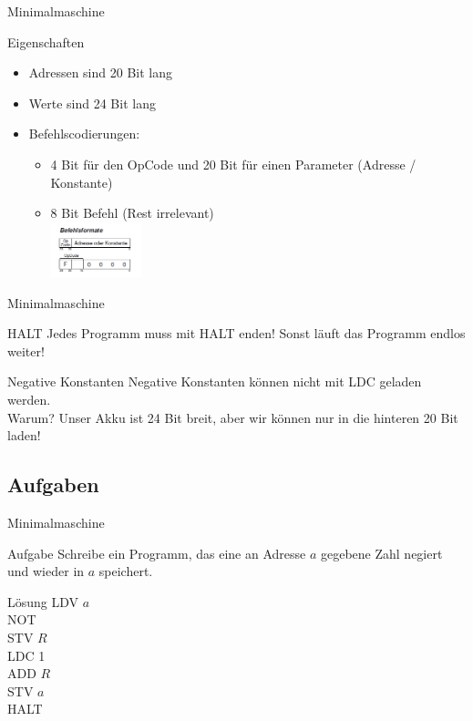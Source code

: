 \begin{frame}{Minimalmaschine}
	\begin{exampleblock}{Eigenschaften}
		\begin{itemize}
		\item Adressen sind 20 Bit lang
		\item Werte sind 24 Bit lang
		\item Befehlscodierungen:
		\begin{itemize}
			\item 4 Bit für den OpCode und 20 Bit für einen Parameter (Adresse / Konstante)
			\item 8 Bit Befehl (Rest irrelevant)\\
			\includegraphics[width=100px]{../topics/speicher-mima/MIMA_commands.png}\\
		\end{itemize} 
	\end{itemize}
	\end{exampleblock}
\end{frame}

\begin{frame}{Minimalmaschine}
	\begin{alertblock}{HALT}
		Jedes Programm muss mit HALT enden! Sonst läuft das Programm endlos weiter!
	\end{alertblock}

	\begin{alertblock}{Negative Konstanten}
		Negative Konstanten können nicht mit LDC geladen werden.\\
		Warum? \pause Unser Akku ist 24 Bit breit, aber wir können nur in die hinteren 20 Bit laden!
	\end{alertblock}
\end{frame}

\subsection{Aufgaben}
\begin{frame}{Minimalmaschine}
	\begin{exampleblock}{Aufgabe}
		Schreibe ein Programm, das eine an Adresse $a$ gegebene Zahl negiert und wieder in $a$ speichert.
	\end{exampleblock}
	\pause
	\begin{block}{Lösung}
			LDV $a$\\
			NOT\\
			STV $R$\\
			LDC 1\\
			ADD $R$\\
			STV $a$\\
			HALT
		\end{block}
\end{frame}

